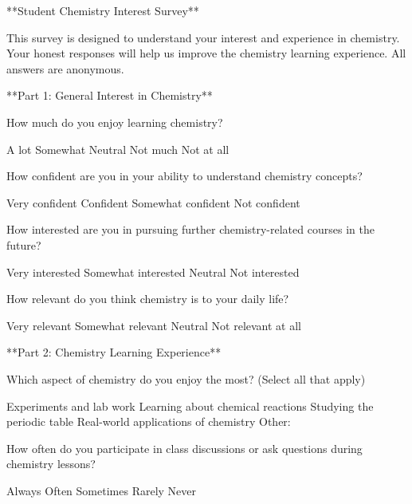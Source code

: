 \documentclass{exam}
\begin{document}
**Student Chemistry Interest Survey**

This survey is designed to understand your interest and experience in chemistry. Your honest responses will help us improve the chemistry learning experience. All answers are anonymous.

**Part 1: General Interest in Chemistry**

\begin{questions}
    
\question How much do you enjoy learning chemistry?  
\begin{checkboxes}
    \choice A lot  
    \choice Somewhat  
    \choice Neutral  
    \choice Not much  
    \choice Not at all
\end{checkboxes}

\question How confident are you in your ability to understand chemistry concepts?  
\begin{checkboxes}
    \choice Very confident  
    \choice Confident  
    \choice Somewhat confident  
    \choice Not confident
\end{checkboxes}


\question How interested are you in pursuing further chemistry-related courses in the future?  
\begin{checkboxes}
    
    \choice Very interested  
    \choice Somewhat interested  
    \choice Neutral  
    \choice Not interested
\end{checkboxes}

\question How relevant do you think chemistry is to your daily life?  
\begin{checkboxes}
    \choice Very relevant  
    \choice Somewhat relevant  
    \choice Neutral  
    \choice Not relevant at all
\end{checkboxes}
   
   **Part 2: Chemistry Learning Experience**

\question Which aspect of chemistry do you enjoy the most? (Select all that apply)  
   \begin{checkboxes}
   \choice Experiments and lab work  
   \choice Learning about chemical reactions  
   \choice Studying the periodic table  
   \choice Real-world applications of chemistry  
   \choice Other:
\end{checkboxes}
   
\question How often do you participate in class discussions or ask questions during chemistry lessons?  
   \begin{checkboxes}
   \choice Always  
   \choice Often  
   \choice Sometimes  
   \choice Rarely  
   \choice Never
\end{checkboxes}
   

\end{questions}
\end{document}
